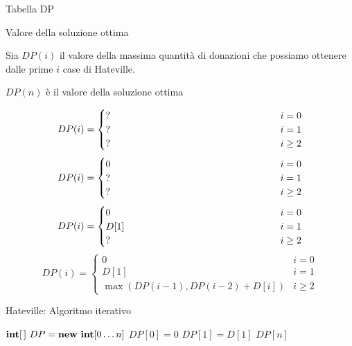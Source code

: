 \begin{frame}{Tabella DP}

\begin{block}{Valore della soluzione ottima}
\BIL
\item Sia $DP(i)$ il \alert{valore} della massima quantità di donazioni che possiamo
ottenere dalle prime $i$ case di Hateville. 
\item $DP(n)$ è il valore della soluzione ottima
\EIL
\end{block}

\begin{overprint}
\[
  DP(i) =
  \begin{cases}
   \makebox[6cm][l]{?} & i = 0 \\
   \makebox[6cm][l]{?} & i = 1 \\
   \makebox[6cm][l]{?} & i \geq 2 
   \end{cases}
\]
\[
  DP(i) =
  \begin{cases}
   0 & i = 0 \\
  \makebox[6cm][l]{?} & i = 1 \\
  \makebox[6cm][l]{?} & i \geq 2 
   \end{cases}
\]
\[
  DP(i) =
  \begin{cases}
   0 & i = 0 \\
   D[1] & i = 1 \\
  \makebox[6cm][l]{?} & i \geq 2 
   \end{cases}
\]
\[
  DP(i) =
  \begin{cases}
   0 & i = 0 \\
   D[1] & i = 1 \\
   \max(DP(i-1), DP(i-2) + D[i]) & i \geq 2 
   \end{cases}
\]
\end{overprint}

\end{frame}

\begin{frame}{Hateville: Algoritmo iterativo}


\pause
\begin{Procedure}
\caption[A]{\textsf{hateville}($\INTEGER[\,]\ D$, \INTEGER $n$)}
$\INTEGER[\,]\ DP = \NEW\ \INTEGER[0 \ldots n]$\;
$DP[0] = 0$\;
$DP[1] = D[1]$\;
\Return $DP[n]$\;
\end{Procedure}

\end{frame}

